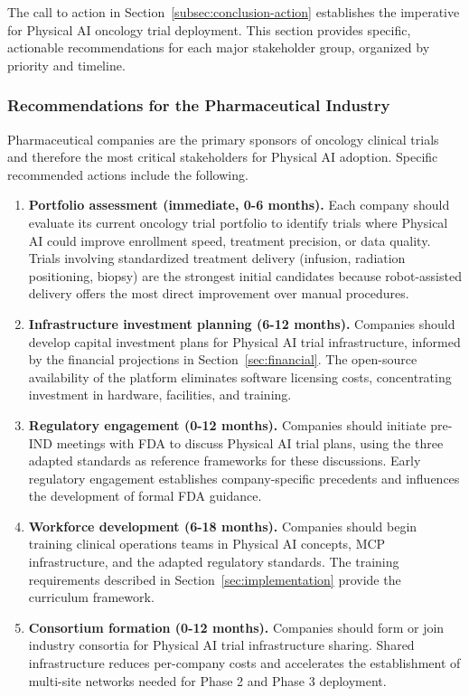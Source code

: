 The call to action in Section~\ref{subsec:conclusion-action} establishes the
imperative for Physical AI oncology trial deployment. This section provides
specific, actionable recommendations for each major stakeholder group,
organized by priority and timeline.

\subsubsection{Recommendations for the Pharmaceutical Industry}

Pharmaceutical companies are the primary sponsors of oncology clinical trials
and therefore the most critical stakeholders for Physical AI adoption.
Specific recommended actions include the following.

\begin{enumerate}[nosep]
  \item \textbf{Portfolio assessment (immediate, 0-6 months).} Each company
    should evaluate its current oncology trial portfolio to identify trials
    where Physical AI could improve enrollment speed, treatment precision, or
    data quality. Trials involving standardized treatment delivery (infusion,
    radiation positioning, biopsy) are the strongest initial candidates
    because robot-assisted delivery offers the most direct improvement over
    manual procedures.

  \item \textbf{Infrastructure investment planning (6-12 months).} Companies
    should develop capital investment plans for Physical AI trial
    infrastructure, informed by the financial projections in
    Section~\ref{sec:financial}. The open-source availability of the platform
    \cite{main-repo, mcp-repo, fl-repo} eliminates software licensing costs,
    concentrating investment in hardware, facilities, and training.

  \item \textbf{Regulatory engagement (0-12 months).} Companies should
    initiate pre-IND meetings with FDA to discuss Physical AI trial plans,
    using the three adapted standards \cite{ich-adapt, cfr50-adapt,
    cfr312-adapt} as reference frameworks for these discussions. Early
    regulatory engagement establishes company-specific precedents and
    influences the development of formal FDA guidance.

  \item \textbf{Workforce development (6-18 months).} Companies should begin
    training clinical operations teams in Physical AI concepts, MCP
    infrastructure, and the adapted regulatory standards. The training
    requirements described in Section~\ref{sec:implementation} provide the
    curriculum framework.

  \item \textbf{Consortium formation (0-12 months).} Companies should form
    or join industry consortia for Physical AI trial infrastructure sharing.
    Shared infrastructure reduces per-company costs and accelerates the
    establishment of multi-site networks needed for Phase 2 and Phase 3
    deployment.
\end{enumerate}

